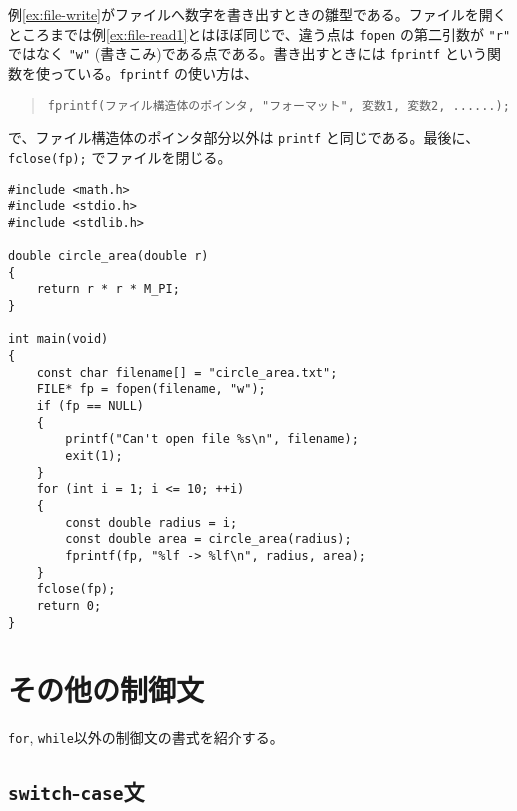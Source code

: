 例\ref{ex:file-write}がファイルへ数字を書き出すときの雛型である。ファイルを開くところまでは例\ref{ex:file-read1}とはほぼ同じで、違う点は \texttt{fopen} の第二引数が \texttt{"r"} ではなく \texttt{"w"} (書きこみ)である点である。書き出すときには \texttt{fprintf} という関数を使っている。\texttt{fprintf} の使い方は、
\begin{quote}
    \begin{verbatim}
fprintf(ファイル構造体のポインタ, "フォーマット", 変数1, 変数2, ......);
\end{verbatim}
\end{quote}
で、ファイル構造体のポインタ部分以外は \texttt{printf} と同じである。最後に、\texttt{fclose(fp);} でファイルを閉じる。
\begin{reidai}\label{ex:file-write}
    \begin{verbatim}
#include <math.h>
#include <stdio.h>
#include <stdlib.h>

double circle_area(double r)
{
    return r * r * M_PI;
}

int main(void)
{
    const char filename[] = "circle_area.txt";
    FILE* fp = fopen(filename, "w");
    if (fp == NULL)
    {
        printf("Can't open file %s\n", filename);
        exit(1);
    }
    for (int i = 1; i <= 10; ++i)
    {
        const double radius = i;
        const double area = circle_area(radius);
        fprintf(fp, "%lf -> %lf\n", radius, area);
    }
    fclose(fp);
    return 0;
}
\end{verbatim}
\end{reidai}

\section{その他の制御文}

\texttt{for}, \texttt{while}以外の制御文の書式を紹介する。

\subsection{\texttt{switch}-\texttt{case}文}

